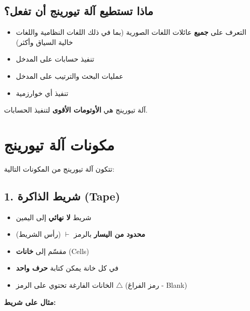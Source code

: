\documentclass[14pt]{extarticle}
\begin{document}
\subsection{ماذا تستطيع آلة تيورينج أن تفعل؟}

\begin{itemize}
    \item التعرف على \textbf{جميع} عائلات اللغات الصورية (بما في ذلك اللغات النظامية واللغات خالية السياق وأكثر)
    \item تنفيذ حسابات على المدخل
    \item عمليات البحث والترتيب على المدخل
    \item تنفيذ أي خوارزمية
\end{itemize}

\begin{boxNote}
آلة تيورينج هي \textbf{الأوتومات الأقوى} لتنفيذ الحسابات.
\end{boxNote}

\clearpage

\section{مكونات آلة تيورينج}

تتكون آلة تيورينج من المكونات التالية:

\subsection{1. شريط الذاكرة (\textenglish{Tape})}

\begin{itemize}
    \item شريط \textbf{لا نهائي} إلى اليمين
    \item \textbf{محدود من اليسار} بالرمز $\vdash$ (رأس الشريط)
    \item مقسّم إلى \textbf{خانات} (\textenglish{Cells})
    \item في كل خانة يمكن كتابة \textbf{حرف واحد}
    \item الخانات الفارغة تحتوي على الرمز $\triangle$ (رمز الفراغ - \textenglish{Blank})
\end{itemize}

\textbf{مثال على شريط:}
\begin{center}
\end{center}
\end{document}

